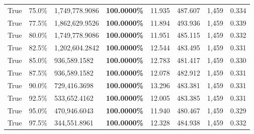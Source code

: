 \begin{table}[H]
\begin{tabular}{lllrllll}
\cline{1-8}
True & 75.0\% & 1,749,778.9086 & \bfseries \color{red} 100.0000\% & 11.935 & 487.607 & 1,459 & 0.334 \\
\cline{1-8}
True & 77.5\% & 1,862,629.9526 & \bfseries \color{red} 100.0000\% & 11.894 & 493.936 & 1,459 & 0.339 \\
\cline{1-8}
True & 80.0\% & 1,749,778.9086 & \bfseries \color{red} 100.0000\% & 11.951 & 485.115 & 1,459 & 0.332 \\
\cline{1-8}
True & 82.5\% & 1,202,604.2842 & \bfseries \color{red} 100.0000\% & 12.544 & 483.495 & 1,459 & 0.331 \\
\cline{1-8}
True & 85.0\% & 936,589.1582 & \bfseries \color{red} 100.0000\% & 12.783 & 481.417 & 1,459 & 0.330 \\
\cline{1-8}
True & 87.5\% & 936,589.1582 & \bfseries \color{red} 100.0000\% & 12.078 & 482.912 & 1,459 & 0.331 \\
\cline{1-8}
True & 90.0\% & 729,416.3698 & \bfseries \color{red} 100.0000\% & 13.296 & 483.381 & 1,459 & 0.331 \\
\cline{1-8}
True & 92.5\% & 533,652.4162 & \bfseries \color{red} 100.0000\% & 12.005 & 483.385 & 1,459 & 0.331 \\
\cline{1-8}
True & 95.0\% & 470,946.6043 & \bfseries \color{red} 100.0000\% & 11.940 & 480.467 & 1,459 & 0.329 \\
\cline{1-8}
True & 97.5\% & 344,551.8961 & \bfseries \color{red} 100.0000\% & 12.328 & 484.938 & 1,459 & 0.332 \\
\cline{1-8}
\bottomrule
\end{tabular}
\end{table}
